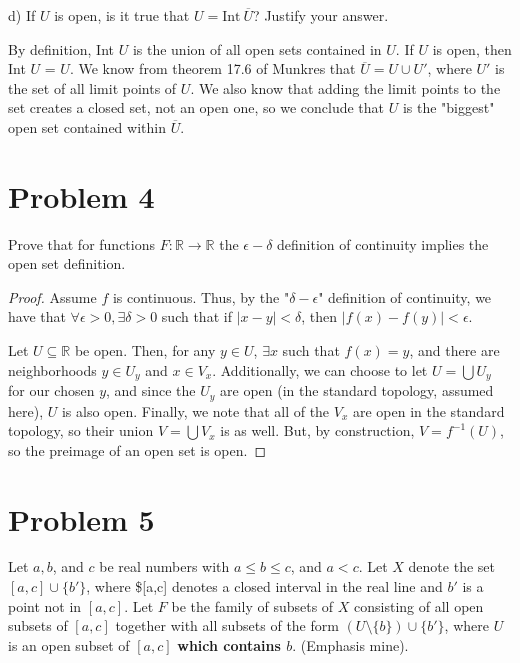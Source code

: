 \documentclass[11pt]{article}
\begin{document}
d) If \(U\) is open, is it true that \(U = \text{Int}\ \overline{U}\)? Justify
   your answer. 

By definition, Int \(U\) is the union of all open sets contained in
\(U\). If \(U\) is open, then Int \(U\) = \(U\). We know from theorem 17.6 of
Munkres that \(\overline{U} = U\cup U'\), where \(U'\) is the set of all
limit points of \(U\). We also know that adding the limit points to the
set creates a closed set, not an open one, so we conclude that \(U\) is
the "biggest" open set contained within \(\overline{U}\). 

\section{Problem 4}
\label{sec:orgbf253fb}

Prove that for functions \(F:\mathbb{R}\rightarrow\mathbb{R}\) the
\(\epsilon - \delta\) definition of continuity implies the open set
definition. 

\begin{proof}
Assume \(f\) is continuous. Thus, by the "\(\delta - \epsilon\)"
definition of continuity, we have that \(\forall \epsilon > 0, \exists
\delta > 0\) such that if \(|x - y| < \delta\), then \(|f(x) - f(y)| <
\epsilon\).

Let \(U\subseteq\mathbb{R}\) be open. Then, for any \(y\in U\), \(\exists
x\) such that \(f(x) = y\), and there are neighborhoods \(y \in U_y\) and
\(x\in V_x\). Additionally, we can choose to let \(U = \bigcup U_y\) for
our chosen \(y\), and since the \(U_y\) are open (in the standard
topology, assumed here), \(U\) is also open. Finally, we note that all
of the \(V_x\) are open in the standard topology, so their union \(V =
\bigcup V_x\) is as well. But, by construction, \(V = f^{-1}(U)\), so the
preimage of an open set is open. 
\end{proof}

\section{Problem 5}
\label{sec:orgfada998}

Let \(a,b\), and \(c\) be real numbers with \(a\leq b\leq c\), and \(a <
c\). Let \(X\) denote the set \([a,c]\cup\{b'\}\), where \$[a,c] denotes a
closed interval in the real line and \(b'\) is a point not in
\([a,c]\). Let \(F\) be the family of subsets of \(X\) consisting of all
open subsets of \([a,c]\) together with all subsets of the form
\((U\setminus \{b\})\cup\{b'\}\), where \(U\) is an open subset of \([a,c]\)
\textbf{which contains $b$}. (Emphasis mine). 
\end{document}
